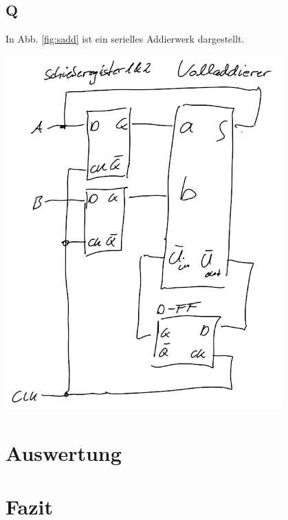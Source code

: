 \documentclass[10pt]{article}
\newenvironment{Figure}
  {\par\medskip\noindent\minipage{\linewidth}}
  {\endminipage\par\medskip}
\begin{document}
\begin{multicols}{2}
	\subsection*{Q}
	In Abb. \ref{fig:sadd} ist ein serielles Addierwerk dargestellt.
	\begin{Figure}
		\centering
		\includegraphics[width=0.8\textwidth]{serielles_addierwerk.png}
		\label{fig:sadd}
	\end{Figure}
	\section{Auswertung}
	\section{Fazit}
\end{multicols}
\end{document}
